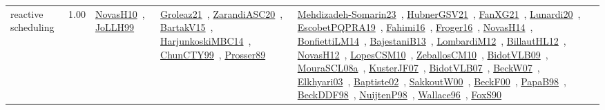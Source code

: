 {\begin{longtable}{p{3cm}r>{\raggedright\arraybackslash}p{6cm}>{\raggedright\arraybackslash}p{6cm}>{\raggedright\arraybackslash}p{8cm}}
\index{reactive scheduling}\index{Concepts!reactive scheduling}reactive scheduling &  1.00 & \href{../works/NovasH10.pdf}{NovasH10}~\cite{NovasH10}, \href{../works/JoLLH99.pdf}{JoLLH99}~\cite{JoLLH99} & \href{../works/Groleaz21.pdf}{Groleaz21}~\cite{Groleaz21}, \href{../works/ZarandiASC20.pdf}{ZarandiASC20}~\cite{ZarandiASC20}, \href{../works/BartakV15.pdf}{BartakV15}~\cite{BartakV15}, \href{../works/HarjunkoskiMBC14.pdf}{HarjunkoskiMBC14}~\cite{HarjunkoskiMBC14}, \href{../works/ChunCTY99.pdf}{ChunCTY99}~\cite{ChunCTY99}, \href{../works/Prosser89.pdf}{Prosser89}~\cite{Prosser89} & \href{../works/Mehdizadeh-Somarin23.pdf}{Mehdizadeh-Somarin23}~\cite{Mehdizadeh-Somarin23}, \href{../works/HubnerGSV21.pdf}{HubnerGSV21}~\cite{HubnerGSV21}, \href{../works/FanXG21.pdf}{FanXG21}~\cite{FanXG21}, \href{../works/Lunardi20.pdf}{Lunardi20}~\cite{Lunardi20}, \href{../works/EscobetPQPRA19.pdf}{EscobetPQPRA19}~\cite{EscobetPQPRA19}, \href{../works/Fahimi16.pdf}{Fahimi16}~\cite{Fahimi16}, \href{../works/Froger16.pdf}{Froger16}~\cite{Froger16}, \href{../works/NovasH14.pdf}{NovasH14}~\cite{NovasH14}, \href{../works/BonfiettiLM14.pdf}{BonfiettiLM14}~\cite{BonfiettiLM14}, \href{../works/BajestaniB13.pdf}{BajestaniB13}~\cite{BajestaniB13}, \href{../works/LombardiM12.pdf}{LombardiM12}~\cite{LombardiM12}, \href{../works/BillautHL12.pdf}{BillautHL12}~\cite{BillautHL12}, \href{../works/NovasH12.pdf}{NovasH12}~\cite{NovasH12}, \href{../works/LopesCSM10.pdf}{LopesCSM10}~\cite{LopesCSM10}, \href{../works/ZeballosCM10.pdf}{ZeballosCM10}~\cite{ZeballosCM10}, \href{../works/BidotVLB09.pdf}{BidotVLB09}~\cite{BidotVLB09}, \href{../works/MouraSCL08a.pdf}{MouraSCL08a}~\cite{MouraSCL08a}, \href{../works/KusterJF07.pdf}{KusterJF07}~\cite{KusterJF07}, \href{../works/BidotVLB07.pdf}{BidotVLB07}~\cite{BidotVLB07}, \href{../works/BeckW07.pdf}{BeckW07}~\cite{BeckW07}, \href{../works/Elkhyari03.pdf}{Elkhyari03}~\cite{Elkhyari03}, \href{../works/Baptiste02.pdf}{Baptiste02}~\cite{Baptiste02}, \href{../works/SakkoutW00.pdf}{SakkoutW00}~\cite{SakkoutW00}, \href{../works/BeckF00.pdf}{BeckF00}~\cite{BeckF00}, \href{../works/PapaB98.pdf}{PapaB98}~\cite{PapaB98}, \href{../works/BeckDDF98.pdf}{BeckDDF98}~\cite{BeckDDF98}, \href{../works/NuijtenP98.pdf}{NuijtenP98}~\cite{NuijtenP98}, \href{../works/Wallace96.pdf}{Wallace96}~\cite{Wallace96}, \href{../works/FoxS90.pdf}{FoxS90}~\cite{FoxS90}\\

\end{longtable}}
